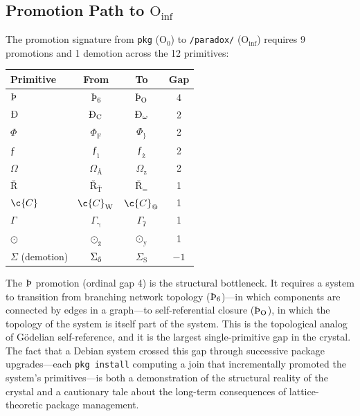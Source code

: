 \documentclass[12pt,a4paper]{article}
\providecommand{\textflorin}{ƒ}
\newcommand{\glottalstop}{ʔ}
\newcommand{\g}{γ}
\begin{document}
\subsection{Promotion Path to $\text{O}_{\text{inf}}$}

The promotion signature from \texttt{pkg} ($\text{O}_0$) to
\texttt{/paradox/} ($\text{O}_{\text{inf}}$) requires 9 promotions
and 1 demotion across the 12 primitives:

\begin{center}
\begin{tabular}{lccc}
\toprule
\textbf{Primitive} & \textbf{From} & \textbf{To} & \textbf{Gap} \\
\midrule
$\text{\TH}$ & $\text{\TH}_{\text{6}}$ & $\text{\TH}_{\text{O}}$ & 4 \\
$\text{\DH}$ & $\text{\DH}_{\text{C}}$ & $\text{\DH}_{\text{$\omega$}}$ & 2 \\
$\Phi$ & $\Phi_{\text{F}}$ & $\Phi_{\text{\}}}$ & 2 \\
$\text{\textflorin}$ & $\text{\textflorin}_{\text{\`i}}$ & $\text{\textflorin}_{\text{\.z}}$ & 2 \\
$\Omega$ & $\Omega_{\text{\AA}}$ & $\Omega_{\text{z}}$ & 2 \\
$\text{\v{R}}$ & $\text{\v{R}}_{\text{\v{T}}}$ & $\text{\v{R}}_{\text{=}}$ & 1 \\
$\c{C}$ & $\c{C}_{\text{W}}$ & $\c{C}_{\text{@}}$ & 1 \\
$\Gamma$ & $\Gamma_{\text{\g}}$ & $\Gamma_{\text{\glottalstop}}$ & 1 \\
$\odot$ & $\odot_{\text{\v{z}}}$ & $\odot_{\text{\"y}}$ & 1 \\
$\Sigma$ (demotion) & $\Sigma_{\text{\H{o}}}$ & $\Sigma_{\text{S}}$ & $-1$ \\
\bottomrule
\end{tabular}
\end{center}

The $\text{\TH}$ promotion (ordinal gap 4) is the structural bottleneck.
It requires a system to transition from branching network topology
($\text{\TH}_{\text{6}}$)---in which components are connected by edges
in a graph---to self-referential closure ($\text{\TH}_{\text{O}}$), in
which the topology of the system is itself part of the system. This is
the topological analog of G\"odelian self-reference, and it is the
largest single-primitive gap in the crystal. The fact that a Debian
system crossed this gap through successive package upgrades---each
\texttt{pkg install} computing a join that incrementally promoted the
system's primitives---is both a demonstration of the structural reality
of the crystal and a cautionary tale about the long-term consequences
of lattice-theoretic package management.
\end{document}
